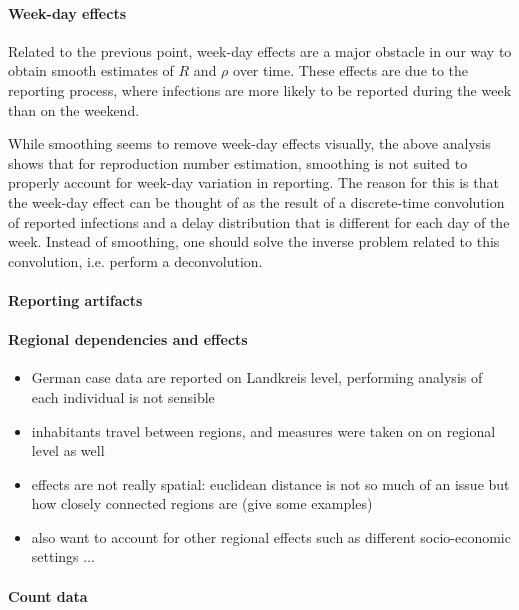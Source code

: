 \paragraph{Week-day effects}
Related to the previous point, week-day effects are a major obstacle in our way to obtain smooth estimates of $R$ and $\rho$ over time. These effects are due to the reporting process, where infections are more likely to be reported during the week than on the weekend. 

While smoothing seems to remove week-day effects visually, the above analysis shows that for reproduction number estimation, smoothing is not suited to properly account for week-day variation in reporting. The reason for this is that the week-day effect can be thought of as the result of a discrete-time convolution of reported infections and a delay distribution that is different for each day of the week. Instead of smoothing, one should solve the inverse problem related to this convolution, i.e. perform a deconvolution. 

\paragraph{Reporting artifacts}



\paragraph{Regional dependencies and effects}
\begin{itemize}
    \item German case data are reported on Landkreis level, performing analysis of each individual is not sensible 
    \item inhabitants travel between regions, and measures were taken on on regional level as well
    \item effects are not really spatial: euclidean distance is not so much of an issue but how closely connected regions are (give some examples)
    \item also want to account for other regional effects such as different socio-economic settings ... 
\end{itemize}

\paragraph{Count data}

